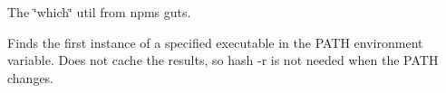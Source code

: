 The \char`\"{}which\char`\"{} util from npm\textquotesingle{}s guts.

Finds the first instance of a specified executable in the P\+A\+TH environment variable. Does not cache the results, so {\ttfamily hash -\/r} is not needed when the P\+A\+TH changes. 